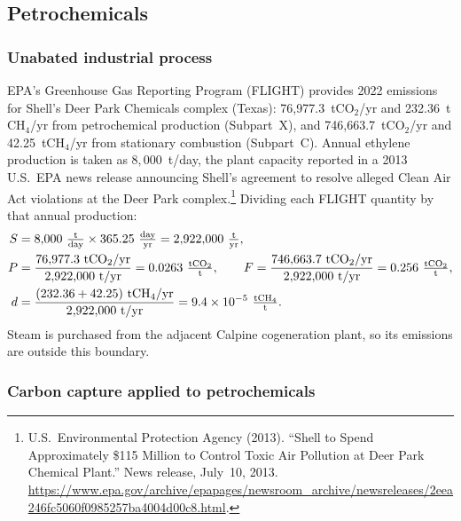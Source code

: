 \documentclass[11pt]{article}
\newcommand{\cotwo}{\ensuremath{\mathrm{CO_2}}}
\newcommand{\chfour}{\ensuremath{\mathrm{CH_4}}}
\begin{document}
\subsection{Petrochemicals}
\label{sec:const_petchem}

\subsubsection{Unabated industrial process}

EPA's Greenhouse Gas Reporting Program (FLIGHT) provides 2022 emissions for Shell's Deer Park Chemicals complex (Texas): 76{,}977.3~t\cotwo{}/yr and 232.36~t\chfour{}/yr from petrochemical production (Subpart~X), and 746{,}663.7~t\cotwo{}/yr and 42.25~t\chfour{}/yr from stationary combustion (Subpart~C). Annual ethylene production is taken as $8{,}000$~t/day, the plant capacity reported in a 2013 U.S.\ EPA news release announcing Shell's agreement to resolve alleged Clean Air Act violations at the Deer Park complex.\footnote{U.S.\ Environmental Protection Agency (2013). ``Shell to Spend Approximately \$115 Million to Control Toxic Air Pollution at Deer Park Chemical Plant.'' News release, July~10, 2013. \url{https://www.epa.gov/archive/epapages/newsroom_archive/newsreleases/2eea246fc5060f0985257ba4004d00c8.html}.} Dividing each FLIGHT quantity by that annual production:
%
\begin{align*}
  S &= 8{,}000~\tfrac{\text{t}}{\text{day}} \times 365.25~\tfrac{\text{day}}{\text{yr}} = 2{,}922{,}000~\tfrac{\text{t}}{\text{yr}}, \\
  P &= \frac{76{,}977.3~\text{t\cotwo{}/yr}}{2{,}922{,}000~\text{t/yr}} = 0.0263~\tfrac{\text{t\cotwo{}}}{\text{t}}, \qquad
  F = \frac{746{,}663.7~\text{t\cotwo{}/yr}}{2{,}922{,}000~\text{t/yr}} = 0.256~\tfrac{\text{t\cotwo{}}}{\text{t}}, \\
  d &= \frac{(232.36 + 42.25)~\text{t\chfour{}/yr}}{2{,}922{,}000~\text{t/yr}} = 9.4\times10^{-5}~\tfrac{\text{t\chfour{}}}{\text{t}}.
\end{align*}
%
Steam is purchased from the adjacent Calpine cogeneration plant, so its emissions are outside this boundary.

\subsubsection{Carbon capture applied to petrochemicals}
\end{document}
